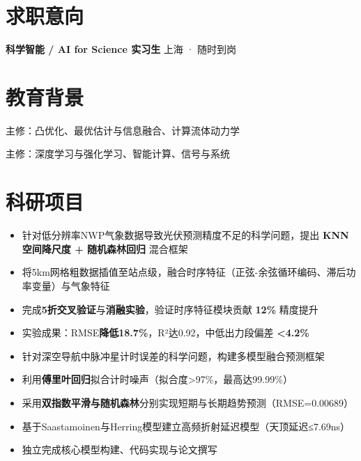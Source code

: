 \documentclass{resume}
\begin{document}

\section{求职意向}
\vspace{-4pt}
\textbf{科学智能 / AI for Science 实习生} \hfill 上海 · 随时到岗

\section{教育背景}
主修：凸优化、最优估计与信息融合、计算流体动力学

主修：深度学习与强化学习、智能计算、信号与系统

\section{科研项目}
\begin{itemize}
  \item 针对低分辨率NWP气象数据导致光伏预测精度不足的科学问题，提出 \textbf{KNN空间降尺度 + 随机森林回归} 混合框架
  \item 将5km网格粗数据插值至站点级，融合时序特征（正弦-余弦循环编码、滞后功率变量）与气象特征
  \item 完成\textbf{5折交叉验证}与\textbf{消融实验}，验证时序特征模块贡献 \textbf{12\%} 精度提升
  \item 实验成果：RMSE\textbf{降低18.7\%}，R²达0.92，中低出力段偏差 \textbf{<4.2\%}
\end{itemize}

\begin{itemize}
  \item 针对深空导航中脉冲星计时误差的科学问题，构建多模型融合预测框架
  \item 利用\textbf{傅里叶回归}拟合计时噪声（拟合度>97\%，最高达99.99\%）
  \item 采用\textbf{双指数平滑与随机森林}分别实现短期与长期趋势预测（RMSE=0.00689）
  \item 基于Saastamoinen与Herring模型建立高频折射延迟模型（天顶延迟≤7.69ns）
  \item 独立完成核心模型构建、代码实现与论文撰写
\end{itemize}
\end{document}

